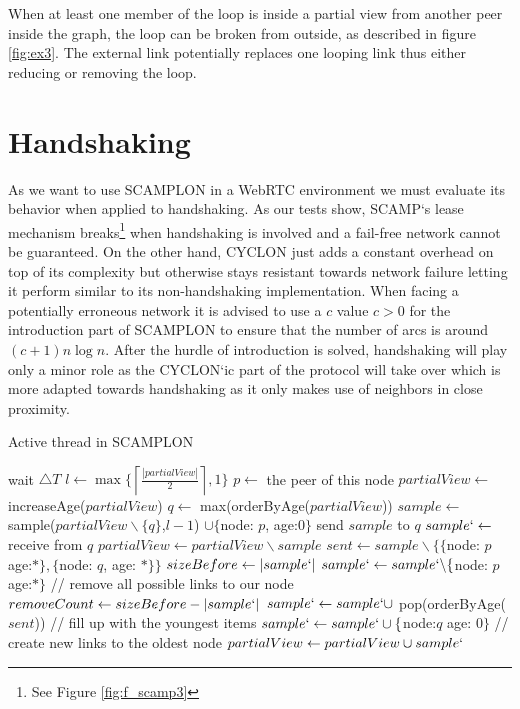 \documentclass[11pt, english, screen]{report-rd-info}
\begin{document}
When at least one member of the loop is inside a partial view from another peer inside the graph, the loop can be broken from outside, as described in figure \ref{fig:ex3}.
The external link potentially replaces one looping link thus either reducing or removing the loop. 

\section{Handshaking}

As we want to use SCAMPLON in a WebRTC environment we must evaluate its behavior when applied to handshaking.
As our tests show, SCAMP`s lease mechanism breaks\footnote{See Figure \ref{fig:f_scamp3}} when handshaking is involved and a fail-free network cannot be guaranteed.
On the other hand, CYCLON just adds a constant overhead on top of its complexity but otherwise stays resistant towards network failure letting it perform similar to its non-handshaking implementation.
When facing a potentially erroneous network it is advised to use a $c$ value $c>0$ for the introduction part of SCAMPLON to ensure that the number of arcs is around $(c+1) n\log{n}$.
After the hurdle of introduction is solved, handshaking will play only a minor role as the CYCLON`ic part of the protocol will take over which is more adapted towards handshaking as it only makes use of neighbors in close proximity.

\begin{algorithm*}[!htbp]
    \caption{Active thread in SCAMPLON}
    \begin{algorithmic}[1]
        \State wait $\bigtriangleup T$
        \State $l \gets \max \{\left \lceil{\frac{|partialView|}{2}}\right \rceil, 1\}$
        \State $p \gets $ the peer of this node
        \State $partialView \gets$ increaseAge($partialView$)
        \State $q \gets$ max(orderByAge($partialView$))
        \State $sample \gets$ sample($partialView\backslash\{q\}$,$l-1$) $\cup \{$node: $p$, age:$0\}$
        \State send $sample$ to $q$
        \State $sample` \gets $ receive from $q$
        \State $partialView \gets partialView \backslash sample$
        \State $sent \gets sample \backslash \{\{$node: $p $ age:$*\}, \{$node: $q$, age: $*\} \}$
        \State $sizeBefore \gets |sample`|$
        \State $sample` \gets sample`\backslash \{$node: $p $ age:$* \}$ // remove all possible links to our node
        \State $removeCount \gets sizeBefore - |sample`|$
        \State $sample` \gets sample` \cup $ pop(orderByAge($sent$)) // fill up with the youngest items
        \Else
        \State $sample` \gets sample` \cup \{ $node:$q $ age: $0\}$ // create new links to the oldest node
        \EndIf
        \EndFor
        \EndIf
        \State $partialView \gets partialView \cup sample`$
        \EndWhile
    \end{algorithmic}
    \label{alg:scamplon1}
\end{algorithm*}
\end{document}
